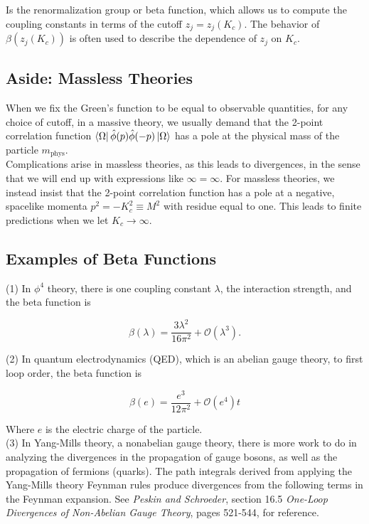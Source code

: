 \noindent Is the renormalization group or beta function, which allows us to compute the coupling constants in terms of the cutoff $z_j = z_j(K_c)$. The behavior of $\beta (z_j(K_c))$ is often used to describe the dependence of $z_j$ on $K_c$. \\

\subsection*{Aside: Massless Theories}

\noindent When we fix the Green's function to be equal to observable quantities, for any choice of cutoff, in a massive theory, we usually demand that the 2-point correlation function $\bra{\Omega} \hat{\phi} (p) \hat{\phi} (-p) \ket{\Omega}$ has a pole at the physical mass of the particle $m_{\text{phys}}$. \\

\noindent Complications arise in massless theories, as this leads to divergences, in the sense that we will end up with expressions like $\infty = \infty$. For massless theories, we instead insist that the 2-point correlation function has a pole at a negative, spacelike momenta $p^2 = -K_c^2 \equiv M^2$ with residue equal to one. This leads to finite predictions when we let $K_c \rightarrow \infty$.

\subsection*{Examples of Beta Functions}

\noindent (1) In $\phi^4$ theory, there is one coupling constant $\lambda$, the interaction strength, and the beta function is 

\begin{equation}
\beta(\lambda) = \frac{3 \lambda^2}{16 \pi^2} + \mathcal{O}(\lambda^3).
\end{equation}

\noindent (2) In quantum electrodynamics (QED), which is an abelian gauge theory, to first loop order, the beta function is 

\begin{equation}
\beta(e) = \frac{e^3}{12 \pi^2} + \mathcal{O}(e^4)t
\end{equation}

\noindent Where $e$ is the electric charge of the particle. \\

\noindent (3) In Yang-Mills theory, a nonabelian gauge theory, there is more work to do in analyzing the divergences in the propagation of gauge bosons, as well as the propagation of fermions (quarks). The path integrals derived from applying the Yang-Mills theory Feynman rules produce divergences from the following terms in the Feynman expansion. See \textit{Peskin and Schroeder}, section 16.5 \textit{One-Loop Divergences of Non-Abelian Gauge Theory}, pages 521-544, for reference.

